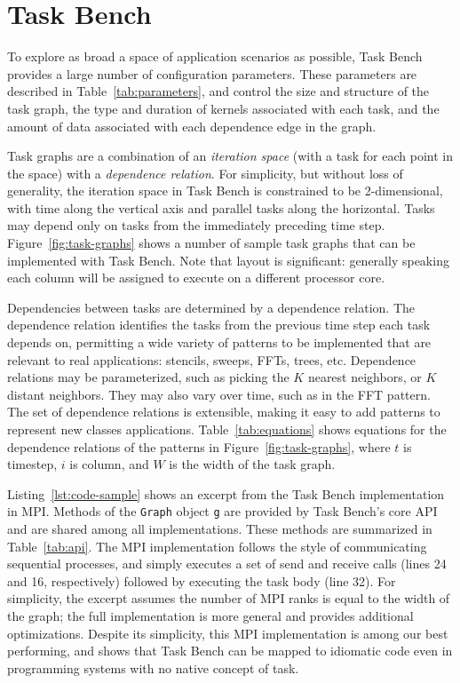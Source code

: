 \section{Task Bench}
\label{sec:task-bench}



To explore as broad a space of application scenarios as possible, Task
Bench provides a large number of configuration parameters. These
parameters are described in
Table~\ref{tab:parameters}, and control the size and
structure of the task graph, the type and duration of kernels
associated with each task, and the amount of data associated with
each dependence edge in the graph.

Task graphs are a combination of an \emph{iteration space} (with a task for
each point in the space) with a \emph{dependence relation}.
For simplicity, but without loss of generality, the iteration space in
Task Bench is constrained to be 2-dimensional, with time along
the vertical axis and parallel tasks along the
horizontal. Tasks may depend only on tasks from the immediately
preceding time step. Figure~\ref{fig:task-graphs} shows a number of sample task
graphs that can be implemented with Task Bench. Note that layout is
significant: generally speaking each column will be
assigned to execute on a different processor core.

Dependencies between tasks are determined by a dependence
relation. The
dependence relation identifies the tasks from the
previous time step each task depends on, permitting a wide variety
of patterns to be implemented that are relevant to real
applications: stencils,
sweeps, FFTs, trees, etc. Dependence relations may be
parameterized, such as picking the $K$ nearest neighbors, or $K$
distant neighbors. They may also vary over time, such as in the FFT pattern. The set of dependence relations is extensible, making it easy to add patterns to represent new classes applications. Table~\ref{tab:equations} shows equations for the
dependence relations of the patterns in Figure~\ref{fig:task-graphs},
where $t$ is timestep, $i$ is column, and $W$ is the width of the task
graph.




Listing~\ref{lst:code-sample} shows an excerpt from the Task Bench
implementation in MPI. Methods of the \lstinline{Graph} object
\lstinline{g} are provided by Task Bench's core API and are shared
among all implementations. These methods are summarized in
Table~\ref{tab:api}. The MPI implementation follows the style of
communicating sequential processes, and simply executes a set of send
and receive calls (lines 24 and 16, respectively) followed by
executing the task body (line 32). For simplicity, the excerpt
assumes the number of MPI ranks is equal to the width of the graph;
the full implementation is more general and provides additional
optimizations. Despite its simplicity, this MPI implementation is
among our best performing, and shows that Task Bench can be mapped to
idiomatic code even in programming systems with no native concept of
task.


